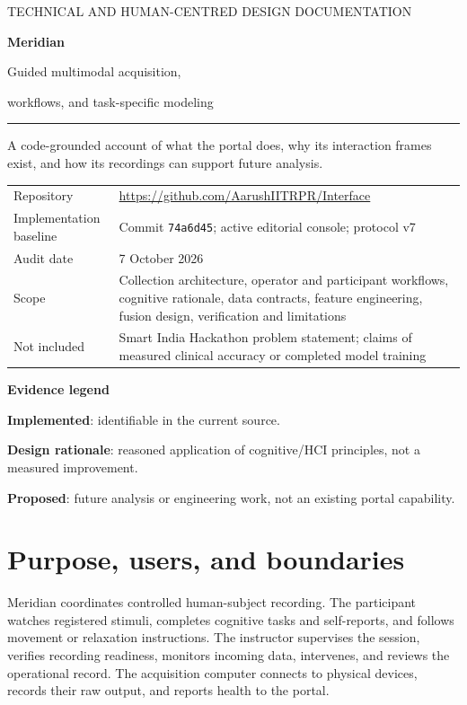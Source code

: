 \documentclass[11pt,a4paper]{article}
\newcommand{\code}[1]{{\small\nolinkurl{#1}}}
\begin{document}
\hypersetup{pageanchor=false}
\begin{titlepage}
\vspace*{16mm}
{\large\color{accent}TECHNICAL AND HUMAN-CENTRED DESIGN DOCUMENTATION}\par
\vspace{12mm}
{\fontsize{40}{44}\selectfont\bfseries\color{ink}Meridian}\par
\vspace{5mm}
{\LARGE Guided multimodal acquisition,\par workflows, and task-specific modeling}\par
\vspace{14mm}
\rule{\textwidth}{0.6pt}
\vspace{5mm}
{\large A code-grounded account of what the portal does, why its interaction frames exist, and how its recordings can support future analysis.}\par
\vspace{10mm}
\begin{tabularx}{\textwidth}{@{}lX@{}}
Repository & \url{https://github.com/AarushIITRPR/Interface}\\
Implementation baseline & Commit \code{74a6d45}; active editorial console; protocol v7\\
Audit date & 7 October 2026\\
Scope & Collection architecture, operator and participant workflows, cognitive rationale, data contracts, feature engineering, fusion design, verification and limitations\\
Not included & Smart India Hackathon problem statement; claims of measured clinical accuracy or completed model training
\end{tabularx}\par
\vfill
\colorbox{wash}{\parbox{\dimexpr\textwidth-2\fboxsep\relax}{\textbf{Evidence legend}\par
\textbf{Implemented}: identifiable in the current source.\par
\textbf{Design rationale}: reasoned application of cognitive/HCI principles, not a measured improvement.\par
\textbf{Proposed}: future analysis or engineering work, not an existing portal capability.}}
\end{titlepage}
\hypersetup{pageanchor=true}
\tableofcontents
\clearpage

\section{Purpose, users, and boundaries}
Meridian coordinates controlled human-subject recording. The participant watches registered stimuli, completes cognitive tasks and self-reports, and follows movement or relaxation instructions. The instructor supervises the session, verifies recording readiness, monitors incoming data, intervenes, and reviews the operational record. The acquisition computer connects to physical devices, records their raw output, and reports health to the portal.
\end{document}
